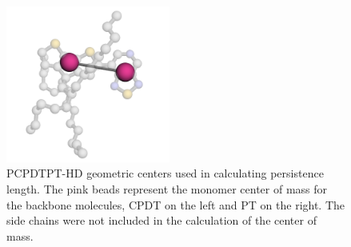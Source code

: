\begin{figure}
    \begin{center}
        \includegraphics[width=0.48\textwidth]{src/figures/pers_l_figs/pcpdtpt_hd_cgmapping.png}
    \end{center}
  \caption{PCPDTPT-HD geometric centers used in calculating persistence length. The pink beads represent the monomer center of mass for the backbone molecules, CPDT on the left and PT on the right. The side chains were not included in the calculation of the center of mass.}
  \label{fig:CG_diagram}
\end{figure}

